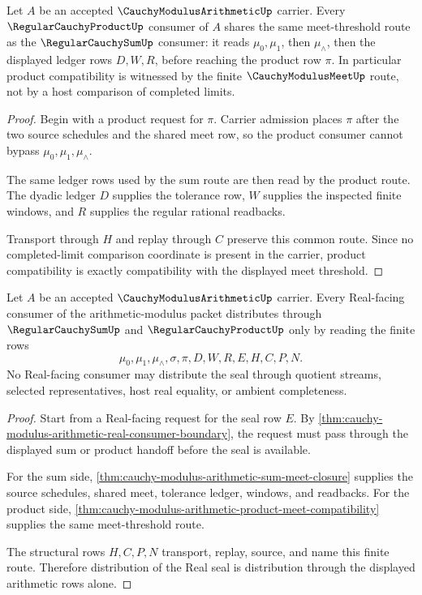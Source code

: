 \begin{theorem}
\label{thm:cauchy-modulus-arithmetic-product-meet-compatibility}
Let $A$ be an accepted $\CauchyModulusArithmeticUp$ carrier. Every
$\RegularCauchyProductUp$ consumer of $A$ shares the same meet-threshold route
as the $\RegularCauchySumUp$ consumer: it reads $\mu_0,\mu_1$, then
$\mu_{\wedge}$, then the displayed ledger rows $D,W,R$, before reaching the
product row $\pi$. In particular product compatibility is witnessed by the
finite $\CauchyModulusMeetUp$ route, not by a host comparison of completed
limits.
\end{theorem}
\begin{proof}
Begin with a product request for $\pi$. Carrier admission places $\pi$ after
the two source schedules and the shared meet row, so the product consumer
cannot bypass $\mu_0,\mu_1,\mu_{\wedge}$.

The same ledger rows used by the sum route are then read by the product route.
The dyadic ledger $D$ supplies the tolerance row, $W$ supplies the inspected
finite windows, and $R$ supplies the regular rational readbacks.

Transport through $H$ and replay through $C$ preserve this common route. Since
no completed-limit comparison coordinate is present in the carrier, product
compatibility is exactly compatibility with the displayed meet threshold.
\end{proof}

\begin{theorem}
\label{thm:cauchy-modulus-arithmetic-real-seal-distribution}
Let $A$ be an accepted $\CauchyModulusArithmeticUp$ carrier. Every
Real-facing consumer of the arithmetic-modulus packet distributes through
$\RegularCauchySumUp$ and $\RegularCauchyProductUp$ only by reading the finite
rows
$$
\mu_0,\mu_1,\mu_{\wedge},\sigma,\pi,D,W,R,E,H,C,P,N.
$$
No Real-facing consumer may distribute the seal through quotient streams,
selected representatives, host real equality, or ambient completeness.
\end{theorem}
\begin{proof}
Start from a Real-facing request for the seal row $E$. By
\autoref{thm:cauchy-modulus-arithmetic-real-consumer-boundary}, the request
must pass through the displayed sum or product handoff before the seal is
available.

For the sum side, \autoref{thm:cauchy-modulus-arithmetic-sum-meet-closure}
supplies the source schedules, shared meet, tolerance ledger, windows, and
readbacks. For the product side,
\autoref{thm:cauchy-modulus-arithmetic-product-meet-compatibility} supplies
the same meet-threshold route.

The structural rows $H,C,P,N$ transport, replay, source, and name this finite
route. Therefore distribution of the Real seal is distribution through the
displayed arithmetic rows alone.
\end{proof}

